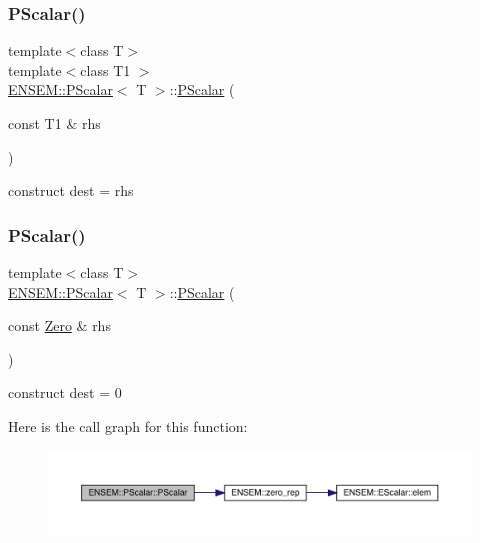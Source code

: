\subsubsection{\texorpdfstring{PScalar()}{PScalar()}\hspace{0.1cm}{\footnotesize\ttfamily [10/18]}}
{\footnotesize\ttfamily template$<$class T$>$ \\
template$<$class T1 $>$ \\
\mbox{\hyperlink{classENSEM_1_1PScalar}{E\+N\+S\+E\+M\+::\+P\+Scalar}}$<$ T $>$\+::\mbox{\hyperlink{classENSEM_1_1PScalar}{P\+Scalar}} (\begin{DoxyParamCaption}\item[{const T1 \&}]{rhs }\end{DoxyParamCaption})\hspace{0.3cm}{\ttfamily [inline]}}



construct dest = rhs 

\mbox{\label{classENSEM_1_1PScalar_a9d7f56a0caeb05ee423b451d2f3aae3b}} 
\subsubsection{\texorpdfstring{PScalar()}{PScalar()}\hspace{0.1cm}{\footnotesize\ttfamily [11/18]}}
{\footnotesize\ttfamily template$<$class T$>$ \\
\mbox{\hyperlink{classENSEM_1_1PScalar}{E\+N\+S\+E\+M\+::\+P\+Scalar}}$<$ T $>$\+::\mbox{\hyperlink{classENSEM_1_1PScalar}{P\+Scalar}} (\begin{DoxyParamCaption}\item[{const \mbox{\hyperlink{structENSEM_1_1Zero}{Zero}} \&}]{rhs }\end{DoxyParamCaption})\hspace{0.3cm}{\ttfamily [inline]}}



construct dest = 0 

Here is the call graph for this function\+:
\nopagebreak
\begin{figure}[H]
\begin{center}
\leavevmode
\includegraphics[width=350pt]{d3/d27/classENSEM_1_1PScalar_a9d7f56a0caeb05ee423b451d2f3aae3b_cgraph}
\end{center}
\end{figure}
\mbox{\label{classENSEM_1_1PScalar_a2bf292f92c6654475bf2bc93c48adcd1}} 
